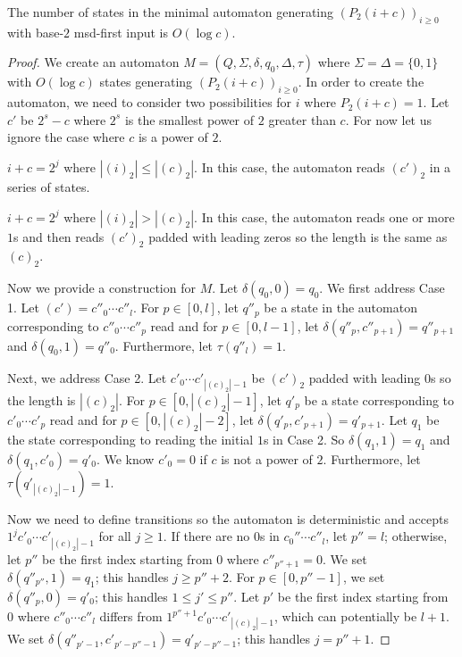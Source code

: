 \documentclass[12pt,reqno]{article}
\begin{document}
\begin{theorem}
    The number of states in the minimal automaton generating $(P_2(i+c))_{i \geq 0}$ with base-$2$ msd-first input is $O(\log c)$.
\end{theorem}
\begin{proof}
    We create an automaton $M=(Q, \Sigma, \delta, q_0, \Delta, \tau)$ where $\Sigma = \Delta = \{0, 1\}$ with $O(\log c)$ states generating $(P_2(i+c))_{i \geq 0}$.
    In order to create the automaton, we need to consider two possibilities for $i$ where $P_2(i+c)=1$. Let $c'$ be $2^s-c$ where $2^s$ is the smallest power of $2$ greater than $c$. For now let us ignore the case where $c$ is a power of $2$.

    \medskip

     $i+c=2^j$ where $|(i)_2|\leq|(c)_2|$. In this case, the automaton reads $(c')_2$ in a series of states.
    
\medskip

     $i+c=2^j$ where $|(i)_2|> |(c)_2|$. In this case, the automaton reads one or more $1$s and then reads $(c')_2$ padded with leading zeros so the length is the same as $(c)_2$.
    
    \medskip

    Now we provide a construction for $M$. Let $\delta(q_0, 0)=q_0$. We first address Case 1. Let $(c')=c''_0\cdots c''_l$.
    For $p\in [0, l]$, let $q''_p$ be a state in the automaton corresponding to $c''_0\cdots c''_p$ read and for $p \in [0, l-1]$, let $\delta(q''_p, c''_{p+1}) = q''_{p+1}$ and $\delta(q_0, 1)=q''_0$. Furthermore, let $\tau(q''_l)=1$.

    Next, we address Case 2. Let $c'_0\cdots c'_{|(c)_2|-1}$ be $(c')_2$ padded with leading $0$s so the length is $|(c)_2|$.
    For $p \in [0, |(c)_2|-1]$, let $q'_p$ be a state  corresponding to $c'_0\cdots c'_p$ read and for $p \in [0, |(c)_2|-2]$, let $\delta(q'_p, c'_{p+1})=q'_{p+1}$. Let $q_1$ be the state corresponding to reading the initial $1$s in Case 2. So $\delta(q_1, 1)=q_1$ and $\delta(q_1, c'_0)=q'_0$. We know $c'_0 = 0$ if $c$ is not a power of $2$. Furthermore, let $\tau(q'_{|(c)_2|-1})=1$.
    
    Now we need to define transitions so the automaton is deterministic and accepts $1^jc'_0\cdots c'_{|(c)_2|-1}$ for all $j \geq 1$.
    If there are no $0$s in $c_0''\cdots c''_l$, let $p''=l$; otherwise, let $p''$ be the first index starting from $0$ where $c''_{p''+1} = 0$. We set $\delta(q''_{p''}, 1)=q_1$; this handles $j \geq p''+2$. For $p \in [0, p''-1]$, we set $\delta(q''_{p}, 0)=q'_0$; this handles $1 \leq j' \leq p''$.  Let $p'$ be the first index starting from $0$ where $c''_0\cdots c''_l$ differs from $1^{p''+1}c'_0\cdots c'_{|(c)_2|-1}$, which can potentially be $l+1$. We set $\delta(q''_{p'-1}, c'_{p'-p''-1}) = q'_{p'-p''-1}$; this handles $j= p''+1$.


\end{proof}
\end{document}
